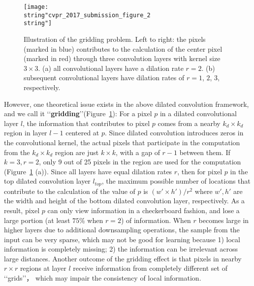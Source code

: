 \documentclass[10pt,twocolumn,letterpaper]{article}
\begin{document}
\begin{figure}[tp]
\begin{center}
\texttt{[image: \\string"cvpr\_2017\_submission\_figure\_2\\string"]}
\end{center}
\caption{Illustration of the gridding problem. Left to right: the pixels (marked in blue) contributes to the calculation of the center pixel (marked in red) through three convolution layers with kernel size $3\times 3$. (a) all convolutional layers have a dilation rate $r=2$. (b) subsequent convolutional layers have dilation rates of $r=1$, $2$, $3$, respectively.}
\vspace{-15pt}
\label{Figure2_gridding}
\end{figure}

However, one theoretical issue exists in the above dilated convolution framework, and we call it \lq\lq \textbf{gridding}\rq\rq (Figure~\ref{Figure2_gridding}):  For a pixel $p$ in a dilated convolutional layer $l$, the information that contributes to pixel $p$ comes from a nearby $k_d\times k_d$ region in layer $l-1$ centered at $p$. Since dilated convolution introduces zeros in the convolutional kernel, the actual pixels that participate in the computation from the $k_d\times k_d$ region are just $k\times k$, with a gap of $r-1$ between them. If $k=3, r=2$, only 9 out of 25 pixels in the region are used for the computation (Figure~\ref{Figure2_gridding} (a)). Since all layers have equal dilation rates $r$, then for pixel $p$ in the top dilated convolution layer $l_{top}$, the maximum possible number of locations that contribute to the calculation of the value of $p$ is $(w'\times h')/r^2$ where $w', h'$ are the width and height of the bottom dilated convolution layer, respectively. As a result, pixel $p$ can only view information in a checkerboard fashion, and lose a large portion (at least $75\%$ when $r=2$) of information. When $r$ becomes large in higher layers due to additional downsampling operations, the sample from the input can be very sparse, which may not be good for learning because 1) local information is completely missing; 2) the information can be irrelevant across large distances. Another outcome of the gridding effect is that pixels in nearby $r\times r$ regions at layer $l$ receive information from completely different set of \lq\lq grids\rq\rq， which may impair the consistency of local information.
\end{document}
